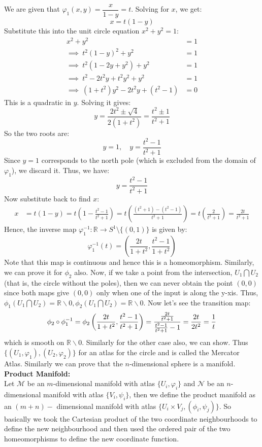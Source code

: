 We are given that \( \varphi_1(x, y) = \dfrac{x}{1 - y} = t \). Solving for \( x \), we get:
\[
x = t(1 - y)
\]
Substitute this into the unit circle equation \( x^2 + y^2 = 1 \):
\begin{align*}
x^2 + y^2 &= 1 \\
\implies \ t^2(1 - y)^2 + y^2 &= 1 \\
\implies \ t^2(1 - 2y + y^2) + y^2 &= 1 \\
\implies \ t^2 - 2t^2 y + t^2 y^2 + y^2 &= 1 \\
\implies \ (1 + t^2)y^2 - 2t^2 y + (t^2 - 1) &= 0
\end{align*}
This is a quadratic in \( y \). Solving it gives:
\[
y = \frac{2t^2 \pm \sqrt{4}}{2(1 + t^2)} = \frac{t^2 \pm 1}{t^2 + 1}
\]
So the two roots are:
\[
y = 1, \quad y = \frac{t^2 - 1}{t^2 + 1}
\]
Since \( y = 1 \) corresponds to the north pole (which is excluded from the domain of \( \varphi_1 \)), we discard it. Thus, we have:
\[
y = \frac{t^2 - 1}{t^2 + 1}
\]
Now substitute back to find \( x \):
\begin{align*}
x &= t(1 - y) = t \left(1 - \frac{t^2 - 1}{t^2 + 1} \right)
= t \left( \frac{(t^2 + 1) - (t^2 - 1)}{t^2 + 1} \right)
= t \left( \frac{2}{t^2 + 1} \right)
= \frac{2t}{t^2 + 1}
\end{align*}
Hence, the inverse map \( \varphi_1^{-1}: \mathbb{R} \to S^1 \setminus \{(0,1)\} \) is given by:
\[
\boxed{
\varphi_1^{-1}(t) = \left( \frac{2t}{1 + t^2}, \frac{t^2 - 1}{1 + t^2} \right)
}
\]
Note that this map is continuous and hence this is a homeomorphism. Similarly, we can prove it for $\phi_2$ also. Now, if we take a point from the intersection, $U_1\bigcap U_2$ (that is, the circle without the poles), then we can never obtain the point $(0,0)$ since both maps give $(0,0)$ only when one of the input is along the y-xis. Thus, $\phi_1(U_1\bigcap U_2) = \mathbb{R}\backslash 0, \phi_2(U_1\bigcap U_2) = \mathbb{R}\backslash 0$. Now let's see the transition map: 
$$\phi_2 \circ \phi_1^{-1} = \phi_2 \left( \frac{2t}{1+t^2}, \frac{t^2-1}{t^2+1} \right) = \frac{\frac{2t}{t^2+1}}{\frac{t^2-1}{t^2+1}-1} = \frac{2t}{2t^2} = \frac{1}{t}$$ which is smooth on $\mathbb{R}\backslash 0 $. Similarly for the other case also, we can show. Thus $\{(U_1, \varphi_1), (U_2, \varphi_2)\}$ for an atlas for the circle and is called the Mercator Atlas. 
Similarly we can prove that the $n$-dimensional sphere is a manifold. \\[0.3cm]
\textbf{Product Manifold:}\\[0.2cm]
Let $\mathcal{M}$ be an $m$-dimensional manifold with atlas $\{U_i,\varphi_i\}$ and $\mathcal{N}$ be an $n$-dimensional manifold with atlas $\{V_i,\psi_i\}$, then we define the product manifold as an $(m+n)-$ dimensional manifold with atlas $\{U_i\times V_j, (\phi_i , \psi_j)\}$. So basically we took the Cartesian product of the two coordinate neighbourhoods to define the new neighbourhood and then used the ordered pair of the two homeomorphisms to define the new coordinate function. \\[0.3cm]
